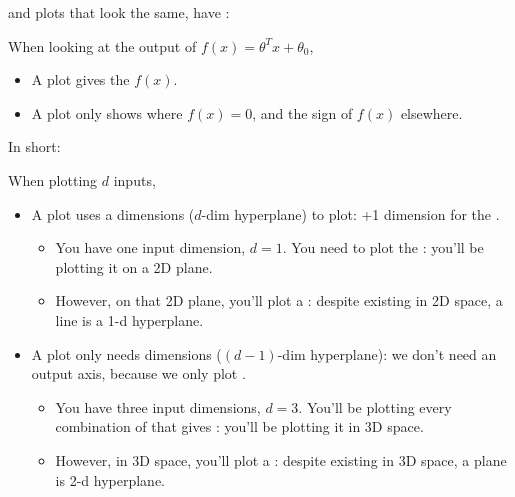         \begin{clarification}
             and  plots that look the same, have : 
            
            When looking at the output of $f(x)=\theta^T x + \theta_0$,
            \begin{itemize}
                \item A  plot gives the  $f(x)$.
                
                \item A  plot only shows where $f(x)=0$, and the sign of $f(x)$ elsewhere.
            \end{itemize}

            In short:


            \subsecdiv
            
            When plotting $d$ inputs,
                \begin{itemize}
                    \item A  plot uses a  dimensions ($d$-dim hyperplane) to plot: +1 dimension for the .

                        \begin{itemize}
                            \item \miniex You have one input dimension, $d=1$. You need to plot the : you'll be plotting it on a 2D plane.
                            \item However, on that 2D plane, you'll plot a : despite existing in 2D space, a line is a 1-d hyperplane.
                        \end{itemize}
                    \item A  plot only needs  dimensions ($(d-1)$-dim hyperplane): we don't need an output axis, because we only plot .
                        \begin{itemize}
                            \item \miniex You have three input dimensions, $d=3$. You'll be plotting every combination of  that gives : you'll be plotting it in 3D space.
                            \item However, in 3D space, you'll plot a : despite existing in 3D space, a plane is 2-d hyperplane.
                        \end{itemize}
                \end{itemize}

        \end{clarification}


